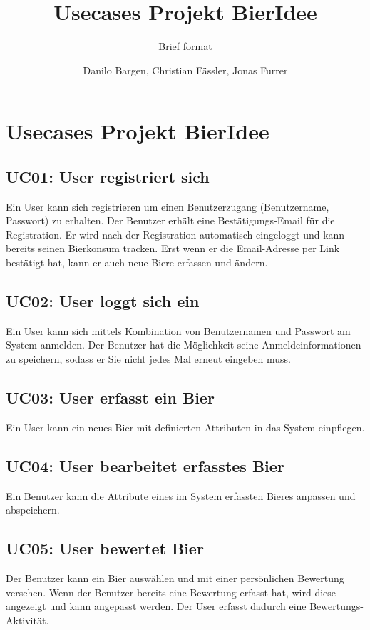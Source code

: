 \documentclass[10pt,a4paper]{scrartcl}
\author{Danilo Bargen, Christian Fässler, Jonas Furrer}
\title{Usecases Projekt BierIdee}
\subtitle{Brief format}
\begin{document}
\begin{titlepage}
	\maketitle
	\vspace{120mm}
	\thispagestyle{empty} %
\end{titlepage}


\section{Usecases Projekt BierIdee}

\subsection*{UC01: User registriert sich}
Ein User kann sich registrieren um einen Benutzerzugang (Benutzername, Passwort) zu erhalten. Der Benutzer erhält eine Bestätigungs-Email für die Registration. Er wird nach der Registration automatisch eingeloggt und kann bereits seinen Bierkonsum tracken. Erst wenn er die Email-Adresse per Link bestätigt hat, kann er auch neue Biere erfassen und ändern.
\subsection*{UC02: User loggt sich ein}
Ein User kann sich mittels Kombination von Benutzernamen und Passwort am System anmelden.
Der Benutzer hat die Möglichkeit seine Anmeldeinformationen zu speichern, sodass er Sie nicht jedes Mal erneut eingeben muss.
\subsection*{UC03: User erfasst ein Bier}
Ein User kann ein neues Bier mit definierten Attributen in das System einpflegen.
\subsection*{UC04: User bearbeitet erfasstes Bier}
Ein Benutzer kann die Attribute eines im System erfassten Bieres anpassen und abspeichern.
\subsection*{UC05: User bewertet Bier}
Der Benutzer kann ein Bier auswählen und mit einer persönlichen Bewertung versehen. Wenn der Benutzer bereits eine Bewertung erfasst hat, wird diese angezeigt und kann angepasst werden. Der User erfasst dadurch eine Bewertungs-Aktivität.
\end{document}
